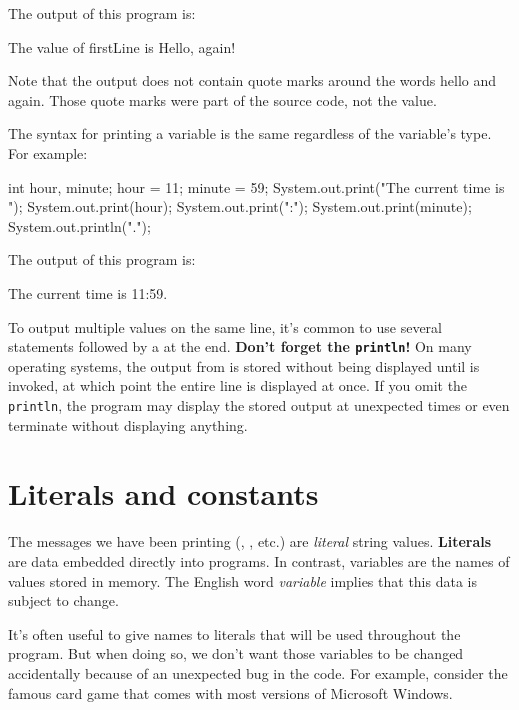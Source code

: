 The output of this program is:

\begin{stdout}
The value of firstLine is Hello, again!
\end{stdout}

Note that the output does not contain quote marks around the words hello and again.
Those quote marks were part of the source code, not the value.

The syntax for printing a variable is the same regardless of the variable's type.
For example:

\begin{code}
    int hour, minute;
    hour = 11;
    minute = 59;
    System.out.print("The current time is ");
    System.out.print(hour);
    System.out.print(":");
    System.out.print(minute);
    System.out.println(".");
\end{code}

The output of this program is:

\begin{stdout}
The current time is 11:59.
\end{stdout}

To output multiple values on the same line, it's common to use several  statements followed by a  at the end.
{\bf Don't forget the {\tt println}!}
On many operating systems, the output from  is stored without being displayed until  is invoked, at which point the entire line is displayed at once.
If you omit the {\tt println}, the program may display the stored output at unexpected times or even terminate without displaying anything.


\section{Literals and constants}


The messages we have been printing (, , etc.) are {\em literal} string values.
{\bf Literals} are data embedded directly into programs.
In contrast, variables are the names of values stored in memory.
The English word {\em variable} implies that this data is subject to change.

It's often useful to give names to literals that will be used throughout the program.
But when doing so, we don't want those variables to be changed accidentally because of an unexpected bug in the code.
For example, consider the famous card game that comes with most versions of Microsoft Windows.


